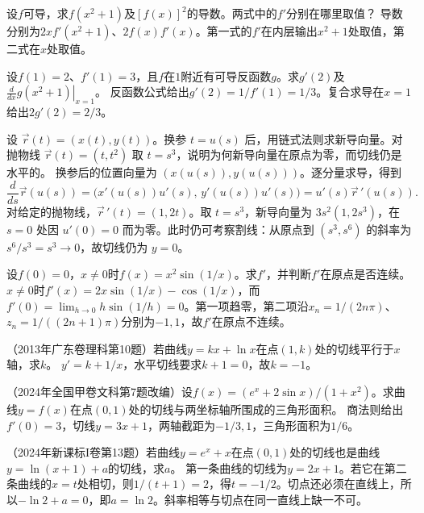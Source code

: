 设\(f\)可导，求\(f(x^2+1)\)及\([f(x)]^2\)的导数。两式中的\(f'\)分别在哪里取值？
\solutionanswer
导数分别为\(2xf'(x^2+1)\)、\(2f(x)f'(x)\)。第一式的\(f'\)在内层输出\(x^2+1\)处取值，第二式在\(x\)处取值。


设\(f(1)=2\)、\(f'(1)=3\)，且\(f\)在\(1\)附近有可导反函数\(g\)。求\(g'(2)\)及\(\left.\frac d{dx}g(x^2+1)\right|_{x=1}\)。
\solutionanswer
反函数公式给出\(g'(2)=1/f'(1)=1/3\)。复合求导在\(x=1\)给出\(2g'(2)=2/3\)。


设 \(\vec r(t)=(x(t),y(t))\)。换参 \(t=u(s)\) 后，用链式法则求新导向量。对抛物线 \(\vec r(t)=(t,t^2)\) 取 \(t=s^3\)，说明为何新导向量在原点为零，而切线仍是水平的。
\solutionanswer
换参后的位置向量为 \((x(u(s)),y(u(s)))\)。逐分量求导，得到
\[
 \frac{d}{ds}\vec r(u(s))
 =\bigl(x'(u(s))u'(s),\,y'(u(s))u'(s)\bigr)
 =u'(s)\vec r\,'(u(s)).
\]
对给定的抛物线，\(\vec r\,'(t)=(1,2t)\)。取 \(t=s^3\)，新导向量为 \(3s^2(1,2s^3)\)，在 \(s=0\) 处因 \(u'(0)=0\) 而为零。此时仍可考察割线：从原点到 \((s^3,s^6)\) 的斜率为 \(s^6/s^3=s^3\to0\)，故切线仍为 \(y=0\)。


设\(f(0)=0\)，\(x\ne0\)时\(f(x)=x^2\sin(1/x)\)。求\(f'\)，并判断\(f'\)在原点是否连续。
\solutionanswer
\(x\ne0\)时\(f'(x)=2x\sin(1/x)-\cos(1/x)\)，而\(f'(0)=\lim_{h\to0}h\sin(1/h)=0\)。第一项趋零，第二项沿\(x_n=1/(2n\pi)\)、\(z_n=1/((2n+1)\pi)\)分别为\(-1,1\)，故\(f'\)在原点不连续。


（2013年广东卷理科第10题）若曲线\(y=kx+\ln x\)在点\((1,k)\)处的切线平行于\(x\)轴，求\(k\)。
\solutionanswer
\(y'=k+1/x\)，水平切线要求\(k+1=0\)，故\(k=-1\)。


（2024年全国甲卷文科第7题改编）设\(f(x)=(e^x+2\sin x)/(1+x^2)\)。求曲线\(y=f(x)\)在点\((0,1)\)处的切线与两坐标轴所围成的三角形面积。
\solutionanswer
商法则给出\(f'(0)=3\)，切线\(y=3x+1\)，两轴截距为\(-1/3,1\)，三角形面积为\(1/6\)。


（2024年新课标I卷第13题）若曲线\(y=e^x+x\)在点\((0,1)\)处的切线也是曲线\(y=\ln(x+1)+a\)的切线，求\(a\)。
\solutionanswer
第一条曲线的切线为\(y=2x+1\)。若它在第二条曲线的\(x=t\)处相切，则\(1/(t+1)=2\)，得\(t=-1/2\)。切点还必须在直线上，所以\(-\ln2+a=0\)，即\(a=\ln2\)。斜率相等与切点在同一直线上缺一不可。



